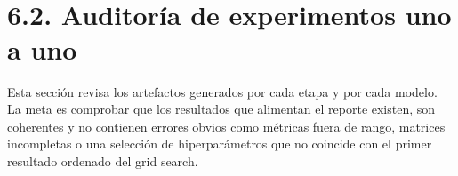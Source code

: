 \documentclass[11pt]{article}
\begin{document}
    \begin{center}
    \end{center}
    { \hspace*{\fill} \\}
    
    \begin{center}
    \end{center}
    { \hspace*{\fill} \\}
    
    \begin{center}
    \end{center}
    { \hspace*{\fill} \\}
    
    \begin{center}
    \end{center}
    { \hspace*{\fill} \\}
    
    \section{6.2. Auditoría de experimentos uno a
uno}\label{auditoruxeda-de-experimentos-uno-a-uno}

Esta sección revisa los artefactos generados por cada etapa y por cada
modelo. La meta es comprobar que los resultados que alimentan el reporte
existen, son coherentes y no contienen errores obvios como métricas
fuera de rango, matrices incompletas o una selección de hiperparámetros
que no coincide con el primer resultado ordenado del grid search.
\end{document}

